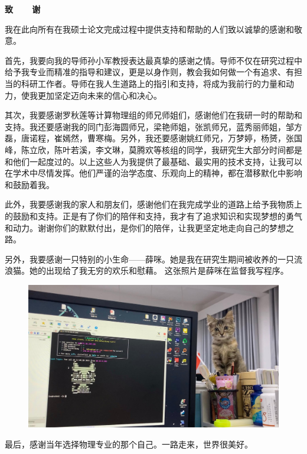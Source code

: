 \newpage
\thispagestyle{empty}
\fontsize{12pt}{13pt}\selectfont
\begin{center}\label{zhixie}
	{\xiaoerhao\textbf{致~~~~谢}}
\end{center}

\begin{flushleft}
\setlength{\parindent}{2em}
\hspace{1.6em}
我在此向所有在我硕士论文完成过程中提供支持和帮助的人们致以诚挚的感谢和敬意。

首先，我要向我的导师孙小军教授表达最真挚的感谢之情。导师不仅在研究过程中给予我专业而精准的指导和建议，更是以身作则，教会我如何做一个有追求、有担当的科研工作者。导师在我人生道路上的指引和支持，将成为我前行的力量和动力，使我更加坚定迈向未来的信心和决心。

其次，我要感谢罗秋莲等计算物理组的师兄师姐们，感谢他们在我研一时的帮助和支持。我还要感谢我的同门彭海圆师兄，梁艳师姐，张凯师兄，蓝秀丽师姐，邹方磊，唐诺程，崔嫣然，曹寒梅。另外，我还要感谢姚红师兄，万梦婷，杨赟，张国峰，陈立欣，陈叶若溪，李文琳，莫腾欢等核组的同学，我研究生大部分时间都是和他们一起度过的。以上这些人为我提供了最基础、最实用的技术支持，让我可以在学术中尽情发挥。他们严谨的治学态度、乐观向上的精神，都在潜移默化中影响和鼓励着我。

此外，我要感谢我的家人和朋友们，感谢他们在我完成学业的道路上给予我物质上的鼓励和支持。正是有了你们的陪伴和支持，我才有了追求知识和实现梦想的勇气和动力。谢谢你们的默默付出，是你们的陪伴，让我更坚定地走向自己的梦想之路。

另外，我要感谢一只特别的小生命——薛咪。她是我在研究生期间被收养的一只流浪猫。她的出现给了我无穷的欢乐和慰藉。
这张照片是薛咪在监督我写程序。
\begin{figure}[htbp]
	\centering
	\includegraphics[width=0.76\linewidth]{figures/xuemi.jpg}
	\label{xuemi}
\end{figure}

最后，感谢当年选择物理专业的那个自己。一路走来，世界很美好。
\end{flushleft}


